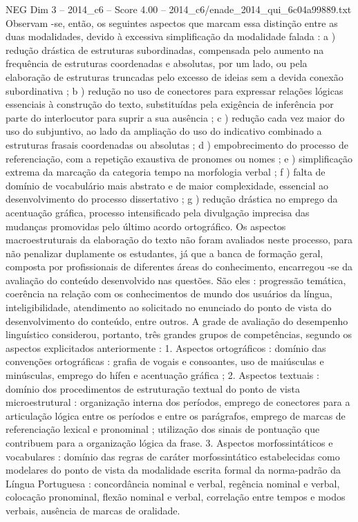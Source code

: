 \begin{textsample}{NEG Dim 3 – 2014\_c6 – Score 4.00 – 2014\_c6/enade\_2014\_qui\_6c04a99889.txt}
Observam -se, então, os seguintes aspectos que marcam essa distinção entre as duas modalidades, devido à excessiva simplificação da modalidade falada : a ) redução drástica de estruturas subordinadas, compensada pelo aumento na frequência de estruturas coordenadas e absolutas, por um lado, ou pela elaboração de estruturas truncadas pelo excesso de ideias sem a devida conexão subordinativa ; b ) redução no uso de conectores para expressar relações lógicas essenciais à construção do texto, substituídas pela exigência de inferência por parte do interlocutor para suprir a sua ausência ; c ) redução cada vez maior do uso do subjuntivo, ao lado da ampliação do uso do indicativo combinado a estruturas frasais coordenadas ou absolutas ; d ) empobrecimento do processo de referenciação, com a repetição exaustiva de pronomes ou nomes ; e ) simplificação extrema da marcação da categoria tempo na morfologia verbal ; f ) falta de domínio de vocabulário mais abstrato e de maior complexidade, essencial ao desenvolvimento do processo dissertativo ; g ) redução drástica no emprego da acentuação gráfica, processo intensificado pela divulgação imprecisa das mudanças promovidas pelo último acordo ortográfico.
Os aspectos macroestruturais da elaboração do texto não foram avaliados neste processo, para não penalizar duplamente os estudantes, já que a banca de formação geral, composta por profissionais de diferentes áreas do conhecimento, encarregou -se da avaliação do conteúdo desenvolvido nas questões.
São eles : progressão temática, coerência na relação com os conhecimentos de mundo dos usuários da língua, inteligibilidade, atendimento ao solicitado no enunciado do ponto de vista do desenvolvimento do conteúdo, entre outros.
A grade de avaliação do desempenho linguístico considerou, portanto, três grandes grupos de competências, segundo os aspectos explicitados anteriormente : 1.
Aspectos ortográficos : domínio das convenções ortográficas : grafia de vogais e consoantes, uso de maiúsculas e minúsculas, emprego do hífen e acentuação gráfica ; 2.
Aspectos textuais : domínio dos procedimentos de estruturação textual do ponto de vista microestrutural : organização interna dos períodos, emprego de conectores para a articulação lógica entre os períodos e entre os parágrafos, emprego de marcas de referenciação lexical e pronominal ; utilização dos sinais de pontuação que contribuem para a organização lógica da frase. 3.
Aspectos morfossintáticos e vocabulares : domínio das regras de caráter morfossintático estabelecidas como modelares do ponto de vista da modalidade escrita formal da norma-padrão da Língua Portuguesa : concordância nominal e verbal, regência nominal e verbal, colocação pronominal, flexão nominal e verbal, correlação entre tempos e modos verbais, ausência de marcas de oralidade.

\end{textsample}
